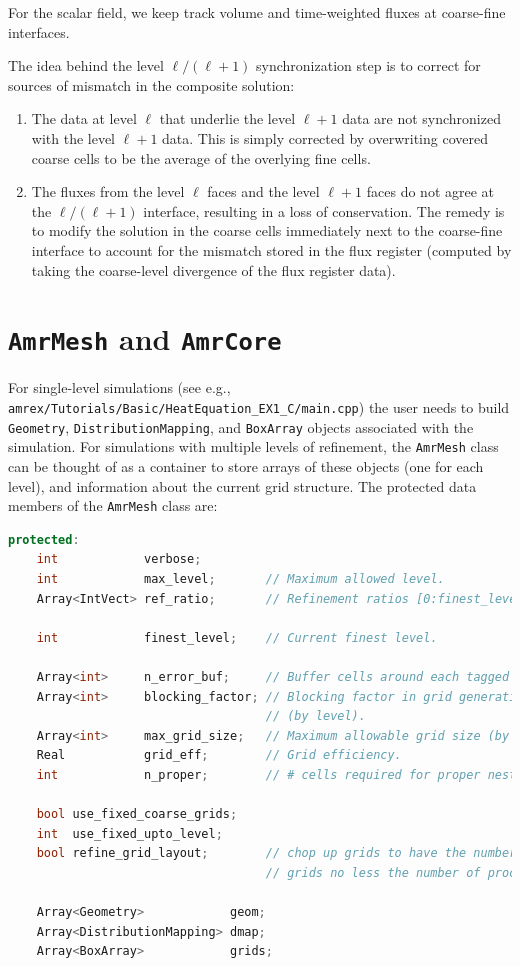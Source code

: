For the scalar field, we keep track volume and time-weighted fluxes at coarse-fine interfaces.

The idea behind the level $\ell/(\ell+1)$ synchronization step is to correct for sources of mismatch in the composite solution:
\begin{enumerate}
\item The data at level $\ell$ that underlie the level  $\ell+1$ data are not synchronized with the level $\ell+1$ data.
This is simply corrected by overwriting covered coarse cells to be the average of the overlying fine cells.
\item The fluxes from the level $\ell$ faces and the level $\ell+1$ faces
do not agree at the $\ell/(\ell+1)$ interface, resulting in a loss of conservation.  
The remedy is to modify the solution in the coarse cells immediately next to the coarse-fine interface
to account for the mismatch stored in the flux register (computed by taking the coarse-level divergence of the
flux register data).
\end{enumerate}






\section{{\tt AmrMesh} and {\tt AmrCore}}

For single-level simulations
(see e.g., {\tt amrex/Tutorials/Basic/HeatEquation\_EX1\_C/main.cpp})
the user needs to build {\tt Geometry}, {\tt DistributionMapping},
and {\tt BoxArray} objects associated with the simulation.  For simulations
with multiple levels of refinement, the {\tt AmrMesh} class can be thought
of as a container to store arrays of these objects (one for each level), and
information about the current grid structure.  The protected data
members of the {\tt AmrMesh} class are:
\begin{lstlisting}[language=cpp]
protected:
    int            verbose;
    int            max_level;       // Maximum allowed level.
    Array<IntVect> ref_ratio;       // Refinement ratios [0:finest_level-1]

    int            finest_level;    // Current finest level.

    Array<int>     n_error_buf;     // Buffer cells around each tagged cell.
    Array<int>     blocking_factor; // Blocking factor in grid generation 
                                    // (by level).
    Array<int>     max_grid_size;   // Maximum allowable grid size (by level).
    Real           grid_eff;        // Grid efficiency.
    int            n_proper;        // # cells required for proper nesting.

    bool use_fixed_coarse_grids;
    int  use_fixed_upto_level;
    bool refine_grid_layout;        // chop up grids to have the number of 
                                    // grids no less the number of procs

    Array<Geometry>            geom;
    Array<DistributionMapping> dmap;
    Array<BoxArray>            grids;    
\end{lstlisting}

